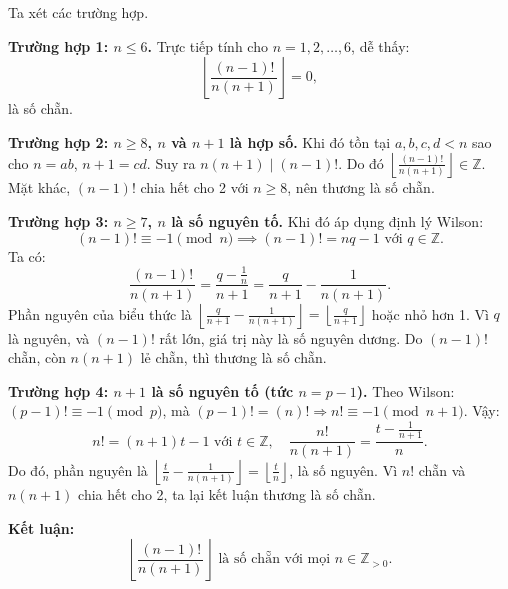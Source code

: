\documentclass[../05-modular-arithmetic-a.tex]{subfiles}
\begin{document}
\begin{soln}\footnotemark
    Ta xét các trường hợp.

    \textbf{Trường hợp 1: \( n \le 6 \).}  
    Trực tiếp tính cho \( n = 1, 2, \dots, 6 \), dễ thấy:
    \[
        \left\lfloor \frac{(n - 1)!}{n(n + 1)} \right\rfloor = 0,
    \]
    là số chẵn.

    \textbf{Trường hợp 2: \( n \ge 8 \), \( n \) và \( n+1 \) là hợp số.}  
    Khi đó tồn tại \( a,b,c,d < n \) sao cho \( n = ab \), \( n+1 = cd \). Suy ra \( n(n+1) \mid (n-1)! \).  
    Do đó \( \left\lfloor \frac{(n-1)!}{n(n+1)} \right\rfloor \in \mathbb{Z} \).  
    Mặt khác, \( (n-1)! \) chia hết cho 2 với \( n \ge 8 \), nên thương là số chẵn.

    \textbf{Trường hợp 3: \( n \ge 7 \), \( n \) là số nguyên tố.}  
    Khi đó áp dụng định lý Wilson:
    \[
        (n - 1)! \equiv -1 \pmod{n} \implies (n - 1)! = nq - 1 \text{ với } q \in \mathbb{Z}.
    \]
    Ta có:
    \[
        \frac{(n - 1)!}{n(n + 1)} = \frac{q - \frac{1}{n}}{n + 1} = \frac{q}{n + 1} - \frac{1}{n(n + 1)}.
    \]
    Phần nguyên của biểu thức là \( \left\lfloor \frac{q}{n+1} - \frac{1}{n(n+1)} \right\rfloor = \left\lfloor \frac{q}{n+1} \right\rfloor \) hoặc nhỏ hơn 1.  
    Vì \( q \) là nguyên, và \( (n - 1)! \) rất lớn, giá trị này là số nguyên dương. Do \( (n - 1)! \) chẵn, còn \( n(n+1) \) lẻ chẵn, thì thương là số chẵn.

    \textbf{Trường hợp 4: \( n + 1 \) là số nguyên tố (tức \( n = p - 1 \)).}  
    Theo Wilson: \( (p - 1)! \equiv -1 \pmod{p} \), mà \( (p - 1)! = (n)! \Rightarrow n! \equiv -1 \pmod{n+1} \).  
    Vậy:
    \[
        n! = (n+1)t - 1 \text{ với } t \in \mathbb{Z},\quad \frac{n!}{n(n+1)} = \frac{t - \frac{1}{n+1}}{n}.
    \]
    Do đó, phần nguyên là \( \left\lfloor \frac{t}{n} - \frac{1}{n(n+1)} \right\rfloor = \left\lfloor \frac{t}{n} \right\rfloor \), là số nguyên.  
    Vì \( n! \) chẵn và \( n(n+1) \) chia hết cho 2, ta lại kết luận thương là số chẵn.

    \textbf{Kết luận:}
    \[
        \boxed{\left\lfloor \frac{(n - 1)!}{n(n + 1)} \right\rfloor \text{ là số chẵn với mọi } n \in \mathbb{Z}_{>0}.}
    \]
\end{soln}

\end{document}
